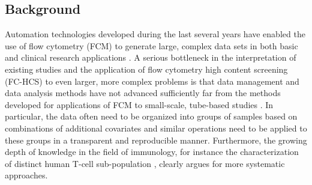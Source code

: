\documentclass[10pt]{bmc_article}
\newenvironment{bmcformat}{\begin{raggedright}\baselineskip20pt\sloppy\setboolean{publ}{false}}{\end{raggedright}\baselineskip20pt\sloppy}
\begin{document}
\begin{bmcformat}
\begin{abstract}
\end{abstract}











\section*{Background}
Automation technologies developed during the last several years have
enabled the use of flow cytometry (FCM) to generate large, complex
data sets in both basic and clinical research applications
\cite{brinkman2007hcf}. A serious bottleneck in the interpretation of
existing studies and the application of flow cytometry high content
screening (FC-HCS) to even larger, more complex problems is that data
management and data analysis methods have not advanced sufficiently
far from the methods developed for applications of FCM
 to small-scale,
tube-based studies \cite{mahnke2007omi}. In particular, the data often
need to be organized into groups of samples based on combinations of
additional covariates and similar operations need to be applied to
these groups in a transparent and reproducible manner. Furthermore,
the growing depth of knowledge in the field of immunology, for
instance the characterization of distinct human T-cell sub-population
\cite{Appay}, clearly argues for more systematic approaches.


\end{bmcformat}
\end{document}
